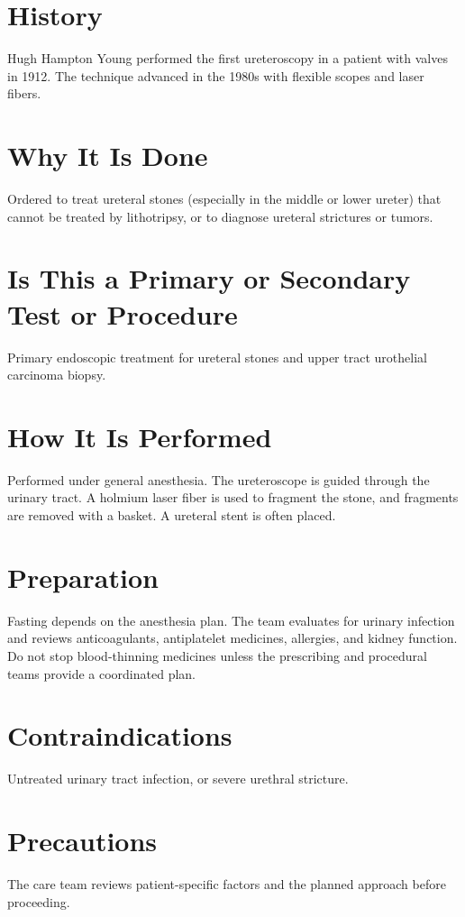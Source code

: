 \section*{History}
Hugh Hampton Young performed the first ureteroscopy in a patient with valves in 1912. The technique advanced in the 1980s with flexible scopes and laser fibers.

\section*{Why It Is Done}
Ordered to treat ureteral stones (especially in the middle or lower ureter) that cannot be treated by lithotripsy, or to diagnose ureteral strictures or tumors.

\section*{Is This a Primary or Secondary Test or Procedure}
Primary endoscopic treatment for ureteral stones and upper tract urothelial carcinoma biopsy.

\section*{How It Is Performed}
Performed under general anesthesia. The ureteroscope is guided through the urinary tract. A holmium laser fiber is used to fragment the stone, and fragments are removed with a basket. A ureteral stent is often placed.

\section*{Preparation}
Fasting depends on the anesthesia plan. The team evaluates for urinary infection and reviews anticoagulants, antiplatelet medicines, allergies, and kidney function. Do not stop blood-thinning medicines unless the prescribing and procedural teams provide a coordinated plan.

\section*{Contraindications}
Untreated urinary tract infection, or severe urethral stricture.

\section*{Precautions}
The care team reviews patient-specific factors and the planned approach before proceeding.

